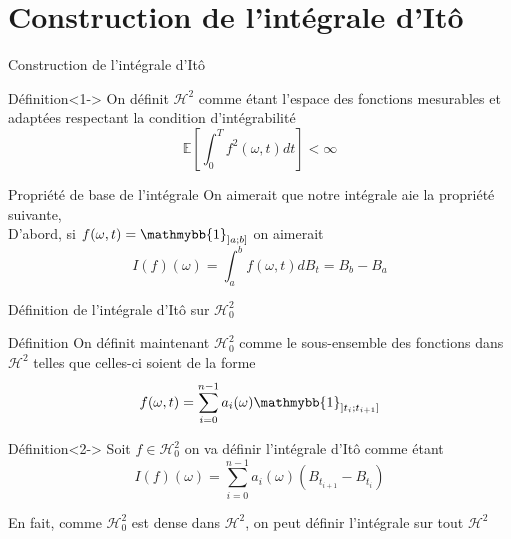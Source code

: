 \documentclass{beamer}
\newcommand{\1}{\mathmybb{1}}
\begin{document}
 \section{Construction de l'intégrale d'Itô}
 \begin{frame}{Construction de l'intégrale d'Itô}
   \begin{block}{Définition}<1->
     On définit $\mathcal{H}^{2}$ comme étant l'espace des fonctions mesurables et adaptées respectant la condition d'intégrabilité \\
     \[
       \mathbb{E}\left[\int_{0}^{T}f^{2}(\omega, t) dt \right] < \infty
     \]
   \end{block}
    \begin{block}{Propriété de base de l'intégrale}
     On aimerait que notre intégrale aie la propriété suivante, \\
D'abord, si $ f(\omega, t) = \1_{\left] a; b \right]} $ on aimerait
     \[
       I(f)(\omega) = \int_{a}^{b}f(\omega, t) dB_{t} = B_{b} - B_{a}
     \]
   \end{block}

 \end{frame}
 
 \begin{frame}{Définition de l'intégrale d'Itô sur $\mathcal{H}^2_0$}
      \begin{block}{Définition}
     On définit maintenant $\mathcal{H}^{2}_{0}$ comme le sous-ensemble des fonctions dans $\mathcal{H}^{2}$ telles que celles-ci soient de la forme 
     \[
       f(\omega, t) = \sum_{i=0}^{n-1}a_{i}(\omega) \1_{\left] t_{i} ; t_{i+1} \right] }
     \]
     \end{block}
     \begin{block}{Définition}<2->
       Soit $ f \in \mathcal{H}^{2}_{0} $ on va définir l'intégrale d'Itô comme étant
       \[
         I(f)(\omega) = \sum_{i=0}^{n-1} a_{i}(\omega)\left( B_{t_{i+1}} - B_{t_{i}} \right)
       \]
     \end{block}
     \pause
   En fait, comme $ \mathcal{H}^{2}_{0}$ est dense dans $\mathcal{H}^{2}$, on peut définir l'intégrale sur tout $\mathcal{H}^2$
 \end{frame}
\end{document}
